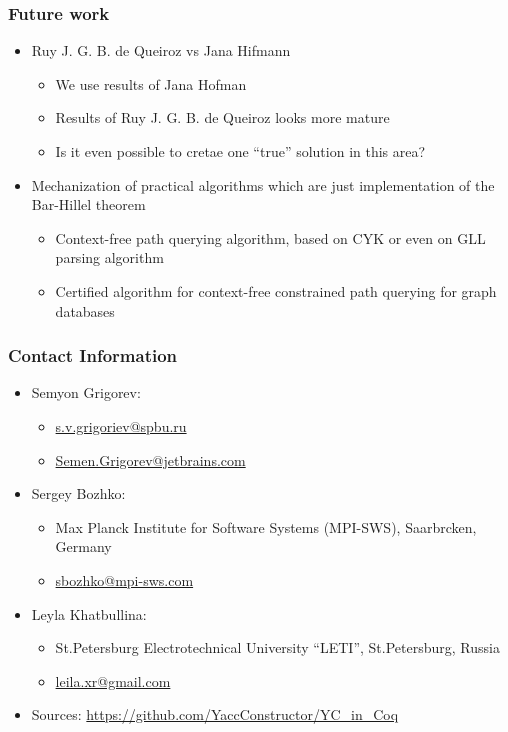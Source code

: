 \documentclass[xcolor=table]{beamer}
\begin{document}
\begin{frame} \frametitle{Future work}

\begin{itemize}
 \item Ruy J. G. B. de Queiroz vs Jana Hifmann
 \begin{itemize}
   \item We use results of Jana Hofman
   \item Results of Ruy J. G. B. de Queiroz looks more mature
   \item Is it even possible to cretae one ``true'' solution in this area?
 \end{itemize}
 \pause
 \item Mechanization of practical algorithms which are just implementation of the Bar-Hillel theorem
 \begin{itemize}
   \item Context-free path querying algorithm, based on CYK or even on GLL parsing algorithm
   \item Certified algorithm for context-free constrained path querying for graph databases
 \end{itemize}
\end{itemize}

\end{frame}



\begin{frame}
\frametitle{Contact Information}
\begin{itemize}
  \item Semyon Grigorev:
    \begin{itemize}
      \item \href{mailto:s.v.grigoriev@spbu.ru}{s.v.grigoriev@spbu.ru}
      \item \href{mailto:Semen.Grigorev@jetbrains.com}{Semen.Grigorev@jetbrains.com}
    \end{itemize}
  \item Sergey Bozhko:
  \begin{itemize}
    \item  Max Planck Institute for Software Systems (MPI-SWS), Saarbrcken, Germany
    \item  \href{mailto:sbozhko@mpi-sws.com}{sbozhko@mpi-sws.com}
  \end{itemize}
    \item Leyla Khatbullina:
  \begin{itemize}
    \item St.Petersburg Electrotechnical University ``LETI'', St.Petersburg, Russia
    \item  \href{mailto:leila.xr@gmail.com}{leila.xr@gmail.com}
  \end{itemize}
  \item Sources: \href{https://github.com/YaccConstructor/YC_in_Coq}{https://github.com/YaccConstructor/YC\_in\_Coq}
\end{itemize}
\vspace{0.5cm}
\end{frame}
\end{document}

